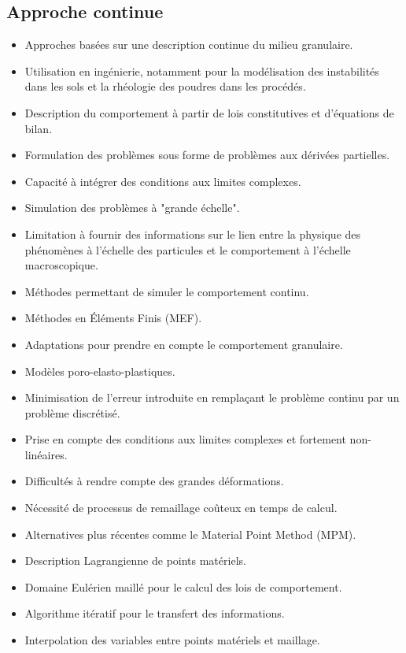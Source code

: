 \subsection{Approche continue}

\begin{itemize}
    \item Approches basées sur une description continue du milieu granulaire.
    \item Utilisation en ingénierie, notamment pour la modélisation des instabilités dans les sols et la rhéologie des poudres dans les procédés.
    \item Description du comportement à partir de lois constitutives et d'équations de bilan.
    \item Formulation des problèmes sous forme de problèmes aux dérivées partielles.
    \item Capacité à intégrer des conditions aux limites complexes.
    \item Simulation des problèmes à "grande échelle".
    \item Limitation à fournir des informations sur le lien entre la physique des phénomènes à l'échelle des particules et le comportement à l'échelle macroscopique.
    \item Méthodes permettant de simuler le comportement continu.
    \item Méthodes en Éléments Finis (MEF).
    \item Adaptations pour prendre en compte le comportement granulaire.
    \item Modèles poro-elasto-plastiques.
    \item Minimisation de l'erreur introduite en remplaçant le problème continu par un problème discrétisé.
    \item Prise en compte des conditions aux limites complexes et fortement non-linéaires.
    \item Difficultés à rendre compte des grandes déformations.
    \item Nécessité de processus de remaillage coûteux en temps de calcul.
    \item Alternatives plus récentes comme le Material Point Method (MPM).
    \item Description Lagrangienne de points matériels.
    \item Domaine Eulérien maillé pour le calcul des lois de comportement.
    \item Algorithme itératif pour le transfert des informations.
    \item Interpolation des variables entre points matériels et maillage.
\end{itemize}


